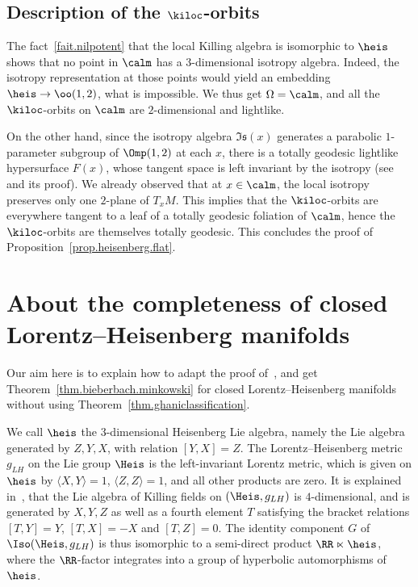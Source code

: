 \subsection{Description of the \texorpdfstring{$\kiloc$}{kiloc}-orbits}

The fact~\ref{fait.nilpotent} that the local Killing algebra is isomorphic to $\heis$ shows that no point in $\calm$ has a $3$-dimensional isotropy algebra. Indeed, the isotropy representation at those points would yield an embedding $\heis \to \oo(1,2)$, what is impossible. We thus get $\Omega=\calm$, and all the $\kiloc$-orbits on $\calm$ are $2$-dimensional and lightlike.

On the other hand, since the isotropy algebra ${\mathfrak{Is}}(x)$ generates a parabolic $1$-parameter subgroup of $\Omp(1,2)$ at each $x$, there is a totally geodesic lightlike hypersurface $F(x)$, whose tangent space is left invariant by the isotropy (see~\cite[Lemma~3.5]{sorin.ghani} and its proof). We already observed that at $x \in \calm$, the local isotropy preserves only one $2$-plane of $T_xM$. This implies that the $\kiloc$-orbits are everywhere tangent to a leaf of a totally geodesic foliation of $\calm$, hence the $\kiloc$-orbits are themselves totally geodesic. This concludes the proof of Proposition~\ref{prop.heisenberg.flat}.

\section{About the completeness of closed Lorentz--Heisenberg manifolds}\label{ann.completeness}

Our aim here is to explain how to adapt the proof of~\cite[Proposition~8.1]{sorin.ghani}, and get Theorem~\ref{thm.bieberbach.minkowski} for closed Lorentz--Heisenberg manifolds without using Theorem~\ref{thm.ghaniclassification}.

We call $\heis$ the $3$-dimensional Heisenberg Lie algebra, namely the Lie algebra generated by $Z,Y,X$, with relation $[Y,X]=Z$. The Lorentz--Heisenberg metric $g_{LH}$ on the Lie group $\Heis$ is the left-invariant Lorentz metric, which is given on $\heis$ by $\langle X,Y\rangle=1$, $\langle Z,Z\rangle=1$, and all other products are zero. It is explained in~\cite[Section~4.1]{sorin.ghani}, that the Lie algebra of Killing fields on $(\Heis,g_{LH})$ is $4$-dimensional, and is generated by $X,Y,Z$ as well as a fourth element $T$ satisfying the bracket relations $[T,Y]=Y$, $[T,X]=-X$ and $[T,Z]=0$. The identity component $G$ of $\Iso(\Heis, g_{LH})$ is thus isomorphic to a semi-direct product $\RR \ltimes \heis$, where the $\RR$-factor integrates into a group of hyperbolic automorphisms of $\heis$.

